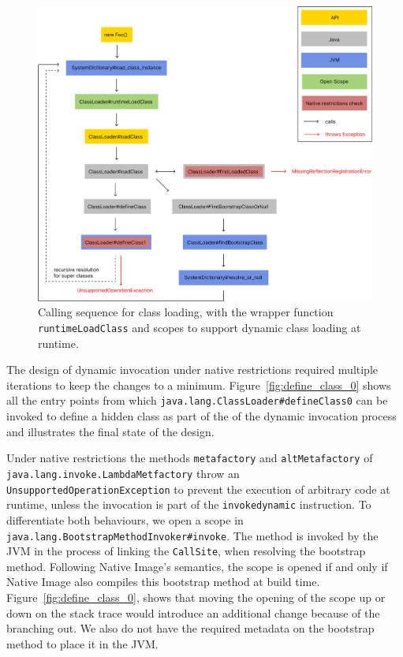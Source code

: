 
\begin{figure}
    \centering
    \includegraphics[scale=0.5]{resources/Group 412.png}
    \caption{Calling sequence for class loading, with the wrapper function \texttt{runtimeLoadClass} and scopes to support dynamic class loading at runtime.}
    \label{fig:load_class}
\end{figure}

The design of dynamic invocation under native restrictions required multiple iterations to keep the changes to a minimum. Figure~\ref{fig:define_class_0} shows all the entry points from which \verb|java.lang.ClassLoader#defineClass0| can be invoked to define a hidden class as part of the of the dynamic invocation process and illustrates the final state of the design. 

Under native restrictions the methods \verb|metafactory| and \verb|altMetafactory| of \verb|java.lang.invoke.LambdaMetfactory| throw an \verb|UnsupportedOperationException| to prevent the execution of arbitrary code at runtime, unless the invocation is part of the \verb|invokedynamic| instruction.
To differentiate both behaviours, we open a scope in \verb|java.lang.BootstrapMethodInvoker#invoke|. The method is invoked by the JVM in the process of linking the \verb|CallSite|, when resolving the bootstrap method. Following Native Image's semantics, the scope is opened if and only if Native Image also compiles this bootstrap method at build time. Figure~\ref{fig:define_class_0}, shows that moving the opening of the scope up or down on the stack trace would introduce an additional change because of the branching out. We also do not have the required metadata on the bootstrap method to place it in the JVM.

